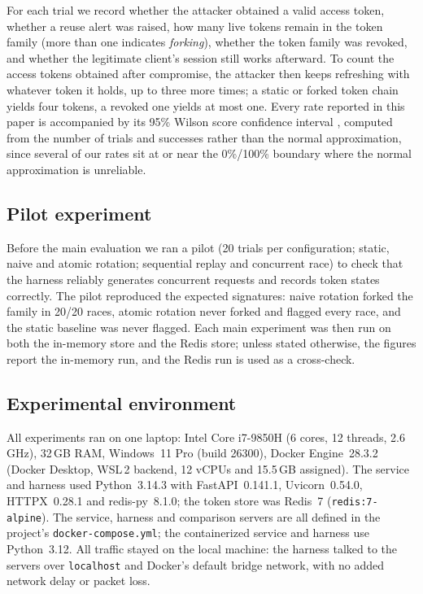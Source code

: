 \documentclass[conference]{IEEEtran}
\begin{document}
For each trial we record whether the attacker obtained a valid access
token, whether a reuse alert was raised, how many live tokens remain in
the token family (more than one indicates \emph{forking}), whether the
token family was revoked, and whether the legitimate client's session
still works afterward. To count the access tokens obtained after
compromise, the attacker then keeps refreshing with whatever token it
holds, up to three more times; a static or forked token chain yields four
tokens, a revoked one yields at most one. Every rate reported in this paper is accompanied by
its 95\% Wilson score confidence interval \cite{wilson1927}, computed from
the number of trials and successes rather than the normal approximation,
since several of our rates sit at or near the 0\%/100\% boundary where the
normal approximation is unreliable.

\subsection{Pilot experiment}

Before the main evaluation we ran a pilot (20 trials per configuration;
static, naive and atomic rotation; sequential replay and concurrent race)
to check that the harness reliably generates concurrent requests and
records token states correctly. The pilot reproduced the expected
signatures: naive rotation forked the family in 20/20 races, atomic
rotation never forked and flagged every race, and the static baseline was
never flagged. Each main experiment was then run on both the in-memory
store and the Redis store; unless stated otherwise, the figures report the
in-memory run, and the Redis run is used as a cross-check.

\subsection{Experimental environment}

All experiments ran on one laptop: Intel Core i7-9850H (6 cores, 12
threads, 2.6\,GHz), 32\,GB RAM, Windows~11 Pro (build 26300), Docker
Engine~28.3.2 (Docker Desktop, WSL\,2 backend, 12 vCPUs and 15.5\,GB
assigned). The service and harness used Python~3.14.3 with FastAPI~0.141.1,
Uvicorn~0.54.0, HTTPX~0.28.1 and redis-py~8.1.0; the token store was
Redis~7 (\texttt{redis:7-alpine}). The service, harness and comparison
servers are all defined in the project's \texttt{docker-compose.yml}; the
containerized service and harness use Python~3.12. All traffic stayed on
the local machine: the harness talked to the servers over
\texttt{localhost} and Docker's default bridge network, with no added
network delay or packet loss.
\end{document}
